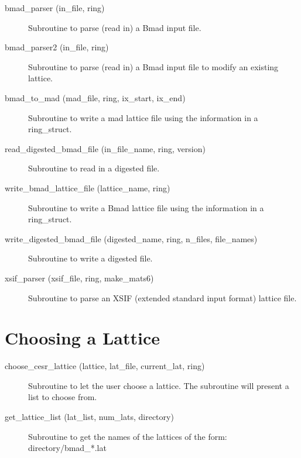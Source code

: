 \begin{description}

\item[bmad\_parser (in\_file, ring)] \Newline
Subroutine to parse (read in) a Bmad input file. 

\item[bmad\_parser2 (in\_file, ring)] \Newline
Subroutine to parse (read in) a Bmad input file to modify an existing lattice. 

\item[bmad\_to\_mad (mad\_file, ring, ix\_start, ix\_end)] \Newline 
Subroutine to write a mad lattice file using the information in
a ring\_struct. 

\item[read\_digested\_bmad\_file (in\_file\_name, ring, version)] \Newline
Subroutine to read in a digested file. 

\item[write\_bmad\_lattice\_file (lattice\_name, ring)] \Newline 
Subroutine to write a Bmad lattice file using the information in
a ring\_struct.

\item[write\_digested\_bmad\_file (digested\_name, ring, n\_files, file\_names)] \Newline
Subroutine to write a digested file. 

\item[xsif\_parser (xsif\_file, ring, make\_mats6)] \Newline 
     Subroutine to parse an XSIF (extended standard input format) lattice file.

\end{description}

\section{Choosing a Lattice}
\label{r:lat}

\begin{description}

\item[choose\_cesr\_lattice (lattice, lat\_file, current\_lat, ring)] \Newline
Subroutine to let the user choose a lattice. The subroutine will present a list to choose from. 

\item[get\_lattice\_list (lat\_list, num\_lats, directory)] \Newline
Subroutine to get the names of the lattices of the form: directory/bmad\_*.lat 

\end{description}

